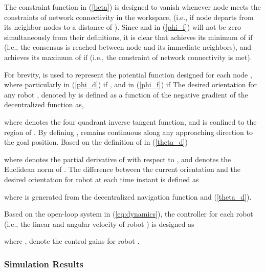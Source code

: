 \documentclass[english]{IOS-Book-Article}
\theoremstyle{definition}
\theoremstyle{definition}
\begin{document}
The constraint function in (\ref{beta}) is designed to vanish whenever
node  meets the constraints of network connectivity in the workspace,
(i.e., if node  departs from its neighbor nodes 
to a distance of ). Since  and  in (\ref{phi_f})
will not be zero simultaneously from their definitions, it is clear
that  achieves its minimum of  if 
(i.e., the consensus is reached between node  and its immediate
neighbors), and  achieves its maximum of  if
 (i.e., the constraint of network connectivity is met).

For brevity,  is used to represent the potential function
designed for each node , where particularly 
in (\ref{phi_d}) if , and 
in (\ref{phi_f}) if  The desired orientation
for any robot , denoted by 
is defined as a function of the negative gradient of the decentralized
function  as,

where 
denotes the four quadrant inverse tangent function, and 
is confined to the region of . By defining
,
 remains continuous along any approaching direction
to the goal position. Based on the definition of  in
(\ref{theta_d})

where  denotes the partial derivative of  with respect to
, and  denotes
the Euclidean norm of . The difference between
the current orientation and the desired orientation for robot 
at each time instant is defined as 

where  is generated from the decentralized
navigation function  and (\ref{theta_d}). 

Based on the open-loop system in (\ref{eq:dynamics}), the controller
for each robot (i.e., the linear and angular velocity of robot )
is designed as


where ,  denote the control
gains for robot . 


\subsubsection{Simulation Results}
\end{document}
